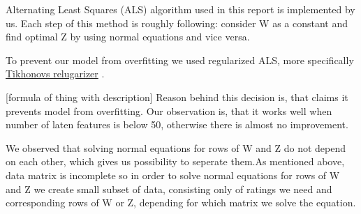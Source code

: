 Alternating Least Squares (ALS) algorithm used in this report is implemented by us. Each step of this method is roughly following: consider W as a constant and find optimal Z by using normal equations and vice versa. 

To prevent our model from overfitting we used regularized ALS, more specifically 
\href{https://en.wikipedia.org/wiki/Tikhonov_regularization}{Tikhonovs relugarizer}
. 

[formula of thing with description]
Reason behind this decision is, that 
\cite{Zhou2008}
 claims it prevents model from overfitting. Our observation is, that it works well when number of laten features is below 50, otherwise there is almost no improvement. 

We observed that solving normal equations for rows of W and Z do not depend on each other, which gives us possibility to seperate them.As mentioned above, data matrix is incomplete so in order to solve normal equations for rows of W and Z we create small subset of data, consisting only of ratings we need and corresponding rows of W or Z, depending for which matrix we solve the equation. 


